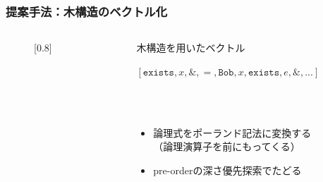\documentclass[dvipdfmx]{beamer}
\newcommand{\LF}[1]{\ensuremath{\texttt{#1}}}
\begin{document}
\begin{frame}
\frametitle{提案手法：木構造のベクトル化}
\begin{columns}[t]
    \begin{column}{0.4\textwidth} %
        \begin{figure}[h]
        \begin{center}
          \scalebox{}[0.8]{
          }
        \end{center}
        \end{figure}
    \end{column}
    \begin{column}{0.6\textwidth} %
      \begin{block}{木構造を用いたベクトル}
        \begin{center}
          $[\LF{exists},x,\&,=,\LF{Bob},x,\LF{exists},e,\&,...]$
        \end{center}
      \end{block}
      \\~\
      \begin{itemize}
        \item 論理式をポーランド記法に変換する\\（論理演算子を前にもってくる）
        \item pre-orderの深さ優先探索でたどる
      \end{itemize}
    \end{column}
\end{columns}

\end{frame}
\end{document}
